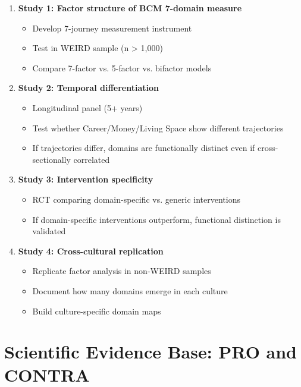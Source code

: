 \begin{enumerate}
\item \textbf{Study 1: Factor structure of BCM 7-domain measure}
   \begin{itemize}[nosep]
   \item Develop 7-journey measurement instrument
   \item Test in WEIRD sample (n > 1,000)
   \item Compare 7-factor vs. 5-factor vs. bifactor models
   \end{itemize}

\item \textbf{Study 2: Temporal differentiation}
   \begin{itemize}[nosep]
   \item Longitudinal panel (5+ years)
   \item Test whether Career/Money/Living Space show different trajectories
   \item If trajectories differ, domains are functionally distinct even if cross-sectionally correlated
   \end{itemize}

\item \textbf{Study 3: Intervention specificity}
   \begin{itemize}[nosep]
   \item RCT comparing domain-specific vs. generic interventions
   \item If domain-specific interventions outperform, functional distinction is validated
   \end{itemize}

\item \textbf{Study 4: Cross-cultural replication}
   \begin{itemize}[nosep]
   \item Replicate factor analysis in non-WEIRD samples
   \item Document how many domains emerge in each culture
   \item Build culture-specific domain maps
   \end{itemize}
\end{enumerate}


\section{Scientific Evidence Base: PRO and CONTRA}
\label{sec:bj-evidence}


